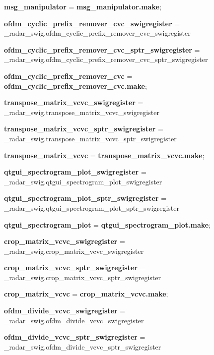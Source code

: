 \begin{DoxyCompactItemize}
\item 
{\bf msg\+\_\+manipulator} = {\bf msg\+\_\+manipulator.\+make};
\item 
{\bf ofdm\+\_\+cyclic\+\_\+prefix\+\_\+remover\+\_\+cvc\+\_\+swigregister} = \+\_\+radar\+\_\+swig.\+ofdm\+\_\+cyclic\+\_\+prefix\+\_\+remover\+\_\+cvc\+\_\+swigregister
\item 
{\bf ofdm\+\_\+cyclic\+\_\+prefix\+\_\+remover\+\_\+cvc\+\_\+sptr\+\_\+swigregister} = \+\_\+radar\+\_\+swig.\+ofdm\+\_\+cyclic\+\_\+prefix\+\_\+remover\+\_\+cvc\+\_\+sptr\+\_\+swigregister
\item 
{\bf ofdm\+\_\+cyclic\+\_\+prefix\+\_\+remover\+\_\+cvc} = {\bf ofdm\+\_\+cyclic\+\_\+prefix\+\_\+remover\+\_\+cvc.\+make};
\item 
{\bf transpose\+\_\+matrix\+\_\+vcvc\+\_\+swigregister} = \+\_\+radar\+\_\+swig.\+transpose\+\_\+matrix\+\_\+vcvc\+\_\+swigregister
\item 
{\bf transpose\+\_\+matrix\+\_\+vcvc\+\_\+sptr\+\_\+swigregister} = \+\_\+radar\+\_\+swig.\+transpose\+\_\+matrix\+\_\+vcvc\+\_\+sptr\+\_\+swigregister
\item 
{\bf transpose\+\_\+matrix\+\_\+vcvc} = {\bf transpose\+\_\+matrix\+\_\+vcvc.\+make};
\item 
{\bf qtgui\+\_\+spectrogram\+\_\+plot\+\_\+swigregister} = \+\_\+radar\+\_\+swig.\+qtgui\+\_\+spectrogram\+\_\+plot\+\_\+swigregister
\item 
{\bf qtgui\+\_\+spectrogram\+\_\+plot\+\_\+sptr\+\_\+swigregister} = \+\_\+radar\+\_\+swig.\+qtgui\+\_\+spectrogram\+\_\+plot\+\_\+sptr\+\_\+swigregister
\item 
{\bf qtgui\+\_\+spectrogram\+\_\+plot} = {\bf qtgui\+\_\+spectrogram\+\_\+plot.\+make};
\item 
{\bf crop\+\_\+matrix\+\_\+vcvc\+\_\+swigregister} = \+\_\+radar\+\_\+swig.\+crop\+\_\+matrix\+\_\+vcvc\+\_\+swigregister
\item 
{\bf crop\+\_\+matrix\+\_\+vcvc\+\_\+sptr\+\_\+swigregister} = \+\_\+radar\+\_\+swig.\+crop\+\_\+matrix\+\_\+vcvc\+\_\+sptr\+\_\+swigregister
\item 
{\bf crop\+\_\+matrix\+\_\+vcvc} = {\bf crop\+\_\+matrix\+\_\+vcvc.\+make};
\item 
{\bf ofdm\+\_\+divide\+\_\+vcvc\+\_\+swigregister} = \+\_\+radar\+\_\+swig.\+ofdm\+\_\+divide\+\_\+vcvc\+\_\+swigregister
\item 
{\bf ofdm\+\_\+divide\+\_\+vcvc\+\_\+sptr\+\_\+swigregister} = \+\_\+radar\+\_\+swig.\+ofdm\+\_\+divide\+\_\+vcvc\+\_\+sptr\+\_\+swigregister

\end{DoxyCompactItemize}
